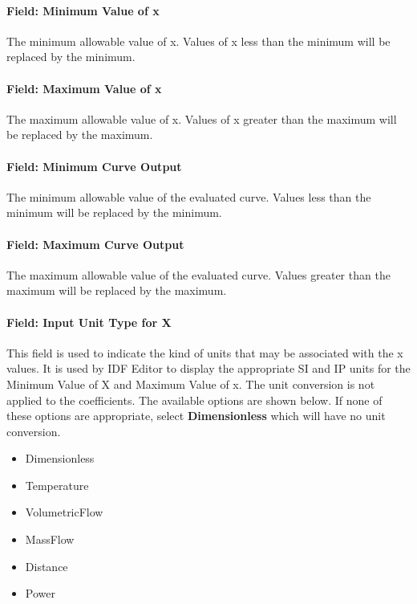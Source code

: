 \paragraph{Field: Minimum Value of x}\label{field-minimum-value-of-x-3}

The minimum allowable value of x. Values of x less than the minimum will be replaced by the minimum.

\paragraph{Field: Maximum Value of x}\label{field-maximum-value-of-x-3}

The maximum allowable value of x. Values of x greater than the maximum will be replaced by the maximum.

\paragraph{Field: Minimum Curve Output}\label{field-minimum-curve-output-2}

The minimum allowable value of the evaluated curve. Values less than the minimum will be replaced by the minimum.

\paragraph{Field: Maximum Curve Output}\label{field-maximum-curve-output-2}

The maximum allowable value of the evaluated curve. Values greater than the maximum will be replaced by the maximum.

\paragraph{Field: Input Unit Type for X}\label{field-input-unit-type-for-x-3}

This field is used to indicate the kind of units that may be associated with the x values. It is used by IDF Editor to display the appropriate SI and IP units for the Minimum Value of X and Maximum Value of x. The unit conversion is not applied to the coefficients. The available options are shown below. If none of these options are appropriate, select \textbf{Dimensionless} which will have no unit conversion.

\begin{itemize}
\item
  Dimensionless
\item
  Temperature
\item
  VolumetricFlow
\item
  MassFlow
\item
  Distance
\item
  Power
\end{itemize}

